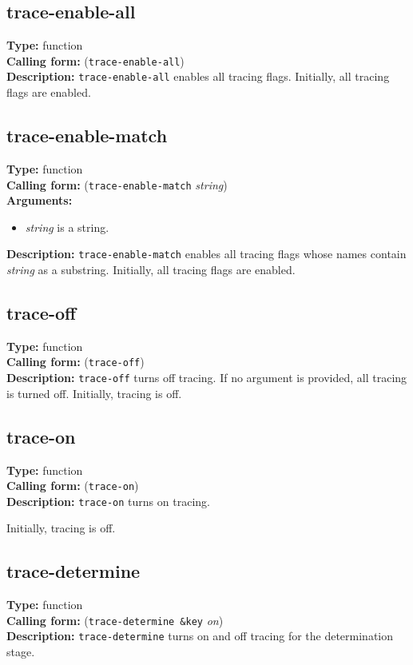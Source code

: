 \documentclass[10pt,a4paper]{report}
\begin{document}
\subsection{trace-enable-all}
{\bf Type:} function
\\{\bf Calling form:} ({\tt trace-enable-all})
\\{\bf Description:} {\tt trace-enable-all} enables all tracing flags.
Initially, all tracing flags are enabled.


\subsection{trace-enable-match}
{\bf Type:} function
\\{\bf Calling form:} ({\tt trace-enable-match} {\em string})
\\{\bf Arguments:} 
\begin{itemize}
\item {\em string} is a string.
\end{itemize}
{\bf Description:} {\tt trace-enable-match} enables all tracing flags whose
names contain {\em string} as a substring.
Initially, all tracing flags are enabled.


\subsection{trace-off}
{\bf Type:} function
\\{\bf Calling form:} ({\tt trace-off})
\\{\bf Description:} {\tt trace-off} turns off tracing.
If no argument is provided, all tracing is turned off. 
Initially, tracing is off.

\subsection{trace-on}
{\bf Type:} function
\\{\bf Calling form:} ({\tt trace-on})
\\{\bf Description:} {\tt trace-on} turns on tracing.

Initially, tracing is off.

\subsection{trace-determine}
{\bf Type:} function
\\{\bf Calling form:} ({\tt trace-determine \&key} {\em on})
\\{\bf Description:} {\tt trace-determine} turns on and off tracing for the
determination stage.
\end{document}
